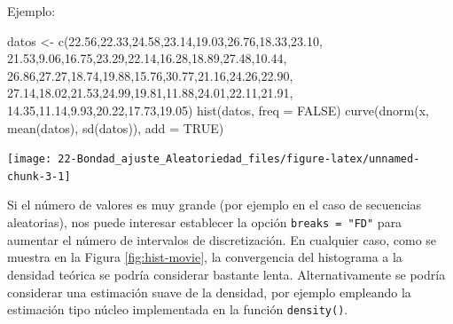 \documentclass[
]{book}
\newenvironment{Shaded}{\begin{snugshade}}{\end{snugshade}}
\newcommand{\AttributeTok}[1]{\textcolor[rgb]{0.77,0.63,0.00}{#1}}
\newcommand{\ConstantTok}[1]{\textcolor[rgb]{0.00,0.00,0.00}{#1}}
\newcommand{\FloatTok}[1]{\textcolor[rgb]{0.00,0.00,0.81}{#1}}
\newcommand{\FunctionTok}[1]{\textcolor[rgb]{0.00,0.00,0.00}{#1}}
\newcommand{\NormalTok}[1]{#1}
\newcommand{\OtherTok}[1]{\textcolor[rgb]{0.56,0.35,0.01}{#1}}
\theoremstyle{break}
\theoremstyle{definition}
\theoremstyle{definition}
\theoremstyle{definition}
\theoremstyle{definition}
\theoremstyle{remark}
\begin{document}
Ejemplo:

\begin{Shaded}
\begin{Highlighting}[]
\NormalTok{datos }\OtherTok{\textless{}{-}} \FunctionTok{c}\NormalTok{(}\FloatTok{22.56}\NormalTok{,}\FloatTok{22.33}\NormalTok{,}\FloatTok{24.58}\NormalTok{,}\FloatTok{23.14}\NormalTok{,}\FloatTok{19.03}\NormalTok{,}\FloatTok{26.76}\NormalTok{,}\FloatTok{18.33}\NormalTok{,}\FloatTok{23.10}\NormalTok{,}
  \FloatTok{21.53}\NormalTok{,}\FloatTok{9.06}\NormalTok{,}\FloatTok{16.75}\NormalTok{,}\FloatTok{23.29}\NormalTok{,}\FloatTok{22.14}\NormalTok{,}\FloatTok{16.28}\NormalTok{,}\FloatTok{18.89}\NormalTok{,}\FloatTok{27.48}\NormalTok{,}\FloatTok{10.44}\NormalTok{,}
  \FloatTok{26.86}\NormalTok{,}\FloatTok{27.27}\NormalTok{,}\FloatTok{18.74}\NormalTok{,}\FloatTok{19.88}\NormalTok{,}\FloatTok{15.76}\NormalTok{,}\FloatTok{30.77}\NormalTok{,}\FloatTok{21.16}\NormalTok{,}\FloatTok{24.26}\NormalTok{,}\FloatTok{22.90}\NormalTok{,}
  \FloatTok{27.14}\NormalTok{,}\FloatTok{18.02}\NormalTok{,}\FloatTok{21.53}\NormalTok{,}\FloatTok{24.99}\NormalTok{,}\FloatTok{19.81}\NormalTok{,}\FloatTok{11.88}\NormalTok{,}\FloatTok{24.01}\NormalTok{,}\FloatTok{22.11}\NormalTok{,}\FloatTok{21.91}\NormalTok{,}
  \FloatTok{14.35}\NormalTok{,}\FloatTok{11.14}\NormalTok{,}\FloatTok{9.93}\NormalTok{,}\FloatTok{20.22}\NormalTok{,}\FloatTok{17.73}\NormalTok{,}\FloatTok{19.05}\NormalTok{)}
\FunctionTok{hist}\NormalTok{(datos, }\AttributeTok{freq =} \ConstantTok{FALSE}\NormalTok{)}
\FunctionTok{curve}\NormalTok{(}\FunctionTok{dnorm}\NormalTok{(x, }\FunctionTok{mean}\NormalTok{(datos), }\FunctionTok{sd}\NormalTok{(datos)), }\AttributeTok{add =} \ConstantTok{TRUE}\NormalTok{)}
\end{Highlighting}
\end{Shaded}

\begin{center}\texttt{[image: 22-Bondad\_ajuste\_Aleatoriedad\_files/figure-latex/unnamed-chunk-3-1]} \end{center}

Si el número de valores es muy grande (por ejemplo en el caso de secuencias aleatorias), nos puede interesar establecer la opción \texttt{breaks\ =\ "FD"} para aumentar el número de intervalos de discretización.
En cualquier caso, como se muestra en la Figura \ref{fig:hist-movie}, la convergencia del histograma a la densidad teórica se podría considerar bastante lenta.
Alternativamente se podría considerar una estimación suave de la densidad, por ejemplo empleando la estimación tipo núcleo implementada en la función \texttt{density()}.
\end{document}
